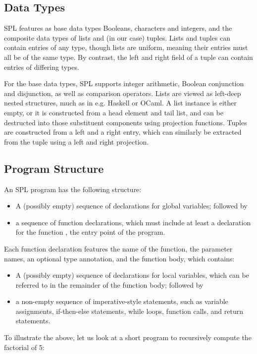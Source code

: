 \subsection{Data Types}
SPL features as base data types Booleans, characters and integers, and the
composite data types of lists and (in our case) tuples. Lists and tuples can
contain entries of any type, though lists are uniform, meaning their entries
must all be of the same type. By contrast, the left and right field of a tuple
can contain entries of differing types.

For the base data types, SPL supports integer arithmetic, Boolean conjunction
and disjunction, as well as comparison operators.
Lists are viewed as left-deep nested structures, much as in e.g. Haskell or
OCaml. A list instance is either empty, or it is constructed from a head element
and tail list, and can be destructed into those substituent components using
projection functions.
Tuples are constructed from a left and a right entry, which can similarly be
extracted from the tuple using a left and right projection.


\subsection{Program Structure}
An SPL program has the following structure:
\begin{itemize}
  \item A (possibly empty) sequence of declarations for global variables;
        followed by
  \item a sequence of function declarations, which must include at least a
        declaration for the function , the entry point of the program.
\end{itemize}

Each function declaration features the name of the function, the parameter names,
an optional type annotation, and the function body, which contains:
\begin{itemize}
  \item A (possibly empty) sequence of declarations for local variables, which
        can be referred to in the remainder of the function body; followed by
  \item a non-empty sequence of imperative-style statements, such as variable
        assignments, if-then-else statements, while loops, function calls,
        and return statements.
\end{itemize}


To illustrate the above, let us look at a short program to
recursively compute the factorial of 5:

